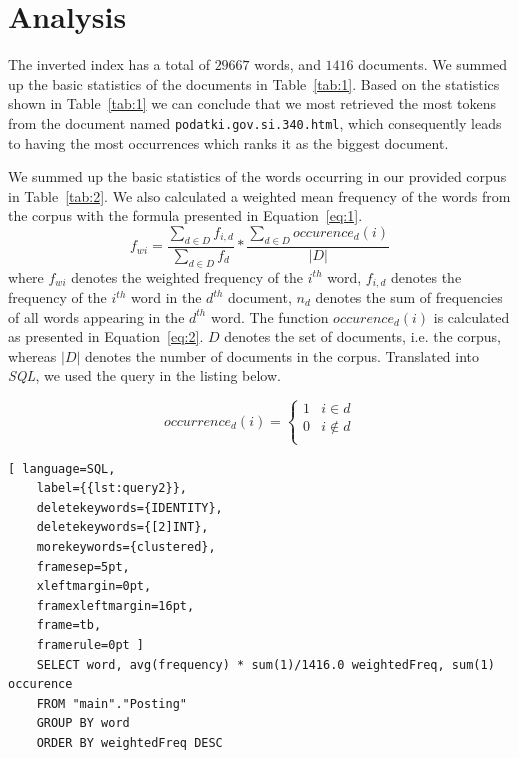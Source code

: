 \documentclass{article}
\begin{document}
	
	
	
	\section{Analysis} \label{sec:analysis}
	
	The inverted index has a total of $29667$ words, and $1416$ documents. 
	We summed up the basic statistics of the documents in Table~\ref{tab:1}. Based on the statistics shown in Table~\ref{tab:1} we can conclude that we most retrieved the most tokens from the document named \texttt{podatki.gov.si.340.html}, which consequently leads to having the most occurrences which ranks it as the biggest document.
	
	We summed up the basic statistics of the words occurring in our provided corpus in Table~\ref{tab:2}. We also calculated a weighted mean frequency of the words from the corpus with the formula presented in Equation~\ref{eq:1}.
	\begin{equation}\label{eq:1}
	f_{wi} = \frac{\scriptstyle \sum_{d \in D} f_{i,d}}{\scriptstyle \sum_{d \in D} f_d} * \frac{\scriptstyle \sum_{d \in D} occurence_d(i)}{|D|}
	\end{equation}
	where $f_{wi}$ denotes the weighted frequency of the $i^{th}$ word, $f_{i,d}$ denotes the frequency of the $i^{th}$ word in the $d^{th}$ document, $n_d$ denotes the sum of frequencies of all words appearing in the $d^{th}$ word. The function $occurence_d(i)$ is calculated as presented in Equation~\ref{eq:2}. $D$ denotes the set of documents, i.e. the corpus, whereas $|D|$ denotes the number of documents in the corpus. Translated into \textit{SQL}, we used the query in the listing below.
	
	\begin{equation} \label{eq:2}
	occurrence_d(i)= \left\{
	\begin{array}{ll}
	1 & i \in d \\
	0 & i \not\in d\\
	\end{array} 
	\right. 
	\end{equation}
	
	\begin{lstlisting}[ language=SQL,
	label={{lst:query2}},
	deletekeywords={IDENTITY},
	deletekeywords={[2]INT},
	morekeywords={clustered},
	framesep=5pt,
	xleftmargin=0pt,
	framexleftmargin=16pt,
	frame=tb,
	framerule=0pt ]
	SELECT word, avg(frequency) * sum(1)/1416.0 weightedFreq, sum(1) occurence
	FROM "main"."Posting"
	GROUP BY word
	ORDER BY weightedFreq DESC
	\end{lstlisting}
	
\end{document}
